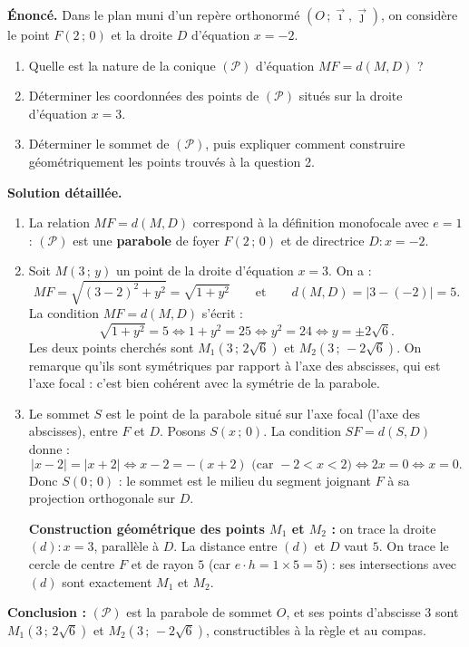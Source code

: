 \documentclass[11pt]{article}
\begin{document}
\begin{exoresolu}
\textbf{Énoncé.} Dans le plan muni d'un repère orthonormé $(O\,;\vec{\imath},\vec{\jmath})$, on considère le point $F(2\,;\,0)$ et la droite $D$ d'équation $x = -2$.
\begin{enumerate}
\item Quelle est la nature de la conique $(\mathcal{P})$ d'équation $MF = d(M, D)$ ?
\item Déterminer les coordonnées des points de $(\mathcal{P})$ situés sur la droite d'équation $x = 3$.
\item Déterminer le sommet de $(\mathcal{P})$, puis expliquer comment construire géométriquement les points trouvés à la question 2.
\end{enumerate}
\tcblower
\textbf{Solution détaillée.}
\begin{enumerate}
\item La relation $MF = d(M, D)$ correspond à la définition monofocale avec $e = 1$ : $(\mathcal{P})$ est une \textbf{parabole} de foyer $F(2\,;\,0)$ et de directrice $D : x = -2$.

\item Soit $M(3\,;\,y)$ un point de la droite d'équation $x = 3$. On a :
\[ MF = \sqrt{(3-2)^2 + y^2} = \sqrt{1 + y^2} \qquad \text{et} \qquad d(M, D) = |3 - (-2)| = 5. \]
La condition $MF = d(M, D)$ s'écrit :
\[ \sqrt{1 + y^2} = 5 \iff 1 + y^2 = 25 \iff y^2 = 24 \iff y = \pm 2\sqrt{6}. \]
Les deux points cherchés sont $M_1(3\,;\,2\sqrt{6})$ et $M_2(3\,;\,-2\sqrt{6})$. On remarque qu'ils sont symétriques par rapport à l'axe des abscisses, qui est l'axe focal : c'est bien cohérent avec la symétrie de la parabole.

\item Le sommet $S$ est le point de la parabole situé sur l'axe focal (l'axe des abscisses), entre $F$ et $D$. Posons $S(x\,;\,0)$. La condition $SF = d(S, D)$ donne :
\[ |x - 2| = |x + 2| \iff x - 2 = -(x + 2) \text{ (car } -2 < x < 2\text{)} \iff 2x = 0 \iff x = 0. \]
Donc $S(0\,;\,0)$ : le sommet est le milieu du segment joignant $F$ à sa projection orthogonale sur $D$.

\textbf{Construction géométrique des points $M_1$ et $M_2$ :} on trace la droite $(d) : x = 3$, parallèle à $D$. La distance entre $(d)$ et $D$ vaut $5$. On trace le cercle de centre $F$ et de rayon $5$ (car $e \cdot h = 1 \times 5 = 5$) : ses intersections avec $(d)$ sont exactement $M_1$ et $M_2$.
\end{enumerate}
\textbf{Conclusion :} $(\mathcal{P})$ est la parabole de sommet $O$, et ses points d'abscisse $3$ sont $M_1(3\,;\,2\sqrt{6})$ et $M_2(3\,;\,-2\sqrt{6})$, constructibles à la règle et au compas.
\end{exoresolu}
\end{document}
